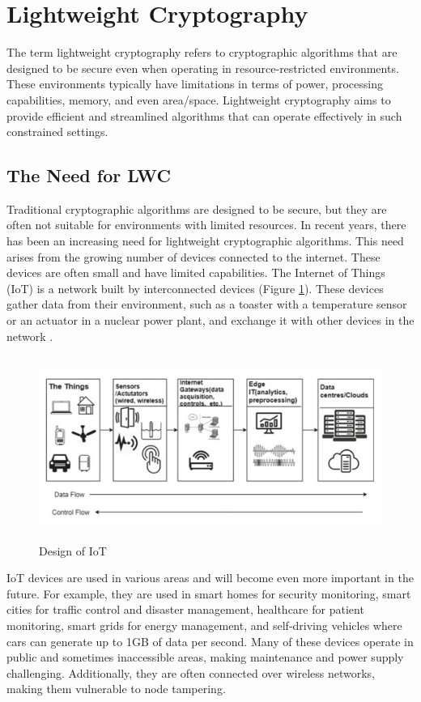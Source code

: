 \section{Lightweight Cryptography}
The term lightweight cryptography refers to cryptographic algorithms that are designed to be secure even when operating in resource-restricted environments. These environments typically have limitations in terms of power, processing capabilities, memory, and even area/space. Lightweight cryptography aims to provide efficient and streamlined algorithms that can operate effectively in such constrained settings.



\subsection{The Need for LWC}
Traditional cryptographic algorithms are designed to be secure, but they are often not suitable for environments with limited resources. In recent years, there has been an increasing need for lightweight cryptographic algorithms. This need arises from the growing number of devices connected to the internet. These devices are often small and have limited capabilities.
\newline
The Internet of Things (IoT) is a network built by interconnected devices (Figure \ref{fig:IoT}). These devices gather data from their environment, such as a toaster with a temperature sensor or an actuator in a nuclear power plant, and exchange it with other devices in the network \cite{chauhan2022analysis}.

\begin{figure}[h]
    \centering
    \includegraphics[width=14.0cm, height=6.0cm]{media/DesignofInternetofThings(IoT).png}
    \caption{Design of IoT}
    \label{fig:IoT}
\end{figure}

IoT devices are used in various areas and will become even more important in the future. For example, they are used in smart homes for security monitoring, smart cities for traffic control and disaster management, healthcare for patient monitoring, smart grids for energy management, and self-driving vehicles where cars can generate up to 1GB of data per second. Many of these devices operate in public and sometimes inaccessible areas, making maintenance and power supply challenging. Additionally, they are often connected over wireless networks, making them vulnerable to node tampering.

